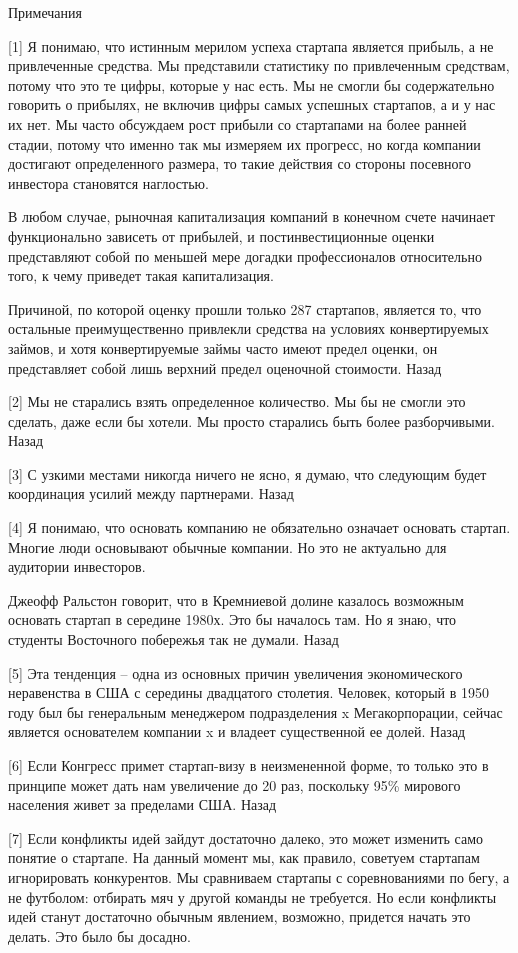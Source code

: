 \documentclass[ebook,12pt,oneside,openany]{memoir}
\begin{document}
Примечания

[1] Я понимаю, что истинным мерилом успеха стартапа является прибыль,
а не привлеченные средства. Мы представили статистику по привлеченным
средствам, потому что это те цифры, которые у нас есть. Мы не смогли
бы содержательно говорить о прибылях, не включив цифры самых успешных
стартапов, а и у нас их нет. Мы часто обсуждаем рост прибыли со
стартапами на более ранней стадии, потому что именно так мы измеряем
их прогресс, но когда компании достигают определенного размера, то
такие действия со стороны посевного инвестора становятся наглостью.

В любом случае, рыночная капитализация компаний в конечном счете
начинает функционально зависеть от прибылей, и постинвестиционные
оценки представляют собой по меньшей мере догадки профессионалов
относительно того, к чему приведет такая капитализация.

Причиной, по которой оценку прошли только 287 стартапов, является то,
что остальные преимущественно привлекли средства на условиях
конвертируемых займов, и хотя конвертируемые займы часто имеют предел
оценки, он представляет собой лишь верхний предел оценочной стоимости.
Назад

[2] Мы не старались взять определенное количество. Мы бы не смогли это
сделать, даже если бы хотели. Мы просто старались быть более
разборчивыми. Назад

[3] С узкими местами никогда ничего не ясно, я думаю, что следующим
будет координация усилий между партнерами. Назад

[4] Я понимаю, что основать компанию не обязательно означает основать
стартап. Многие люди основывают обычные компании. Но это не актуально
для аудитории инвесторов.

Джеофф Ральстон говорит, что в Кремниевой долине казалось возможным
основать стартап в середине 1980х. Это бы началось там. Но я знаю, что
студенты Восточного побережья так не думали. Назад

[5] Эта тенденция – одна из основных причин увеличения экономического
неравенства в США с середины двадцатого столетия. Человек, который в
1950 году был бы генеральным менеджером подразделения x
Мегакорпорации, сейчас является основателем компании x и владеет
существенной ее долей. Назад

[6] Если Конгресс примет стартап-визу в неизмененной форме, то только
это в принципе может дать нам увеличение до 20 раз, поскольку 95\%
мирового населения живет за пределами США. Назад

[7] Если конфликты идей зайдут достаточно далеко, это может изменить
само понятие о стартапе. На данный момент мы, как правило, советуем
стартапам игнорировать конкурентов. Мы сравниваем стартапы с
соревнованиями по бегу, а не футболом: отбирать мяч у другой команды
не требуется. Но если конфликты идей станут достаточно обычным
явлением, возможно, придется начать это делать. Это было бы досадно.
\end{document}
